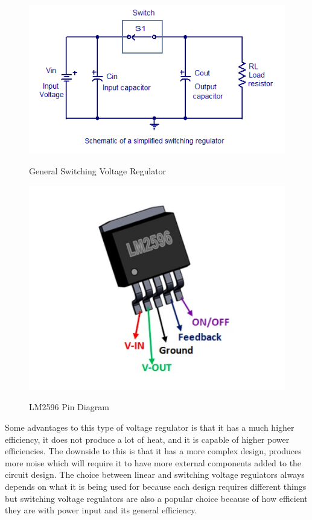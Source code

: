 \begin{figure}[H]
    \caption{General Switching Voltage Regulator}
    \centering
    \includegraphics[width=\textwidth]{images/Gen_Switching_Voltage_Regulator.png}
    \label{fig:general-switching-voltage-regulator}
\end{figure}
\begin{figure}[H]
    \caption{LM2596 Pin Diagram}
    \centering
    \includegraphics[width=\textwidth]{images/LM2596_pin_diagram.png}
    \label{fig:lm2596-pin-diagram}
\end{figure}
Some advantages to this type of voltage regulator is that it has a much higher efficiency, it does not produce a lot of heat, and it is capable of higher power efficiencies. The downside to this is that it has a more complex design, produces more noise which will require it to have more external components added to the circuit design. The choice between linear and switching voltage regulators always depends on what it is being used for because each design requires different things but switching voltage regulators are also a popular choice because of how efficient they are with power input and its general efficiency.\par
